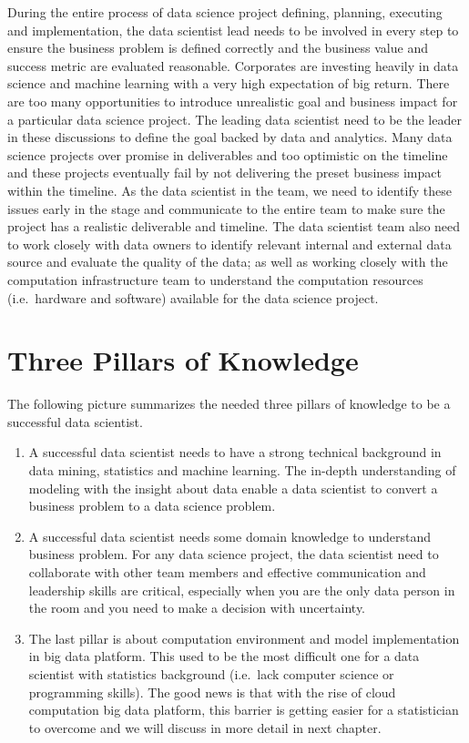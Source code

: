 \documentclass[]{book}
\theoremstyle{definition}
\theoremstyle{definition}
\theoremstyle{remark}
\begin{document}
During the entire process of data science project defining, planning,
executing and implementation, the data scientist lead needs to be
involved in every step to ensure the business problem is defined
correctly and the business value and success metric are evaluated
reasonable. Corporates are investing heavily in data science and machine
learning with a very high expectation of big return. There are too many
opportunities to introduce unrealistic goal and business impact for a
particular data science project. The leading data scientist need to be
the leader in these discussions to define the goal backed by data and
analytics. Many data science projects over promise in deliverables and
too optimistic on the timeline and these projects eventually fail by not
delivering the preset business impact within the timeline. As the data
scientist in the team, we need to identify these issues early in the
stage and communicate to the entire team to make sure the project has a
realistic deliverable and timeline. The data scientist team also need to
work closely with data owners to identify relevant internal and external
data source and evaluate the quality of the data; as well as working
closely with the computation infrastructure team to understand the
computation resources (i.e.~hardware and software) available for the
data science project.

\section{Three Pillars of Knowledge}\label{three-pillars-of-knowledge}

The following picture summarizes the needed three pillars of knowledge
to be a successful data scientist.

\begin{enumerate}
\def\labelenumi{(\arabic{enumi})}
\item
  A successful data scientist needs to have a strong technical
  background in data mining, statistics and machine learning. The
  in-depth understanding of modeling with the insight about data enable
  a data scientist to convert a business problem to a data science
  problem.
\item
  A successful data scientist needs some domain knowledge to understand
  business problem. For any data science project, the data scientist
  need to collaborate with other team members and effective
  communication and leadership skills are critical, especially when you
  are the only data person in the room and you need to make a decision
  with uncertainty.
\item
  The last pillar is about computation environment and model
  implementation in big data platform. This used to be the most
  difficult one for a data scientist with statistics background
  (i.e.~lack computer science or programming skills). The good news is
  that with the rise of cloud computation big data platform, this
  barrier is getting easier for a statistician to overcome and we will
  discuss in more detail in next chapter.
\end{enumerate}
\end{document}
